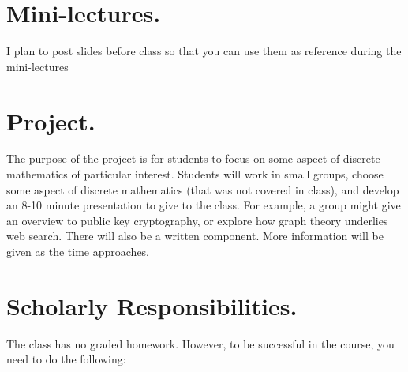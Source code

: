 \documentclass[letterpaper]{inzane_syllabus} %
\begin{document}


\vspace{0.25cm}
\section{Mini-lectures.}  I plan to post slides before class so that you can use them as reference during the mini-lectures

\vspace{0.25cm}
\section{Project.}  The purpose of the project is for students to focus on some aspect of discrete mathematics of particular interest.  Students will work in small groups, choose some aspect of discrete mathematics (that was not covered in class), and develop an 8-10 minute presentation to give to the class.   For example, a group might give an overview to public key cryptography, or explore how graph theory underlies web search.   There will also be a written component. More information will be given as the time approaches.


\vspace{0.25cm}
\section{Scholarly Responsibilities.}  The class has no graded homework. However, to be successful in the course, you need to do the following:
\end{document}
